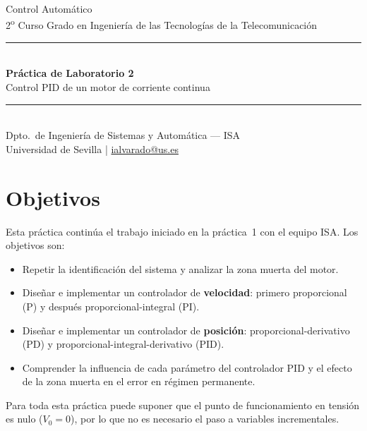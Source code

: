 \documentclass[12pt,a4paper]{article}
\begin{document}

\begin{center}
  {\large Control Automático}\\[2pt]
  {\large 2\textsuperscript{o} Curso Grado en Ingeniería de las Tecnologías de la Telecomunicación}\\[10pt]
  \rule{\linewidth}{1.5pt}\\[6pt]
  {\LARGE\bfseries\color{isablue} Práctica de Laboratorio 2}\\[4pt]
  {\Large Control PID de un motor de corriente continua}\\[4pt]
  \rule{\linewidth}{1.5pt}\\[6pt]
  {\small Dpto.\ de Ingeniería de Sistemas y Automática — ISA\\
   Universidad de Sevilla \quad | \quad \url{ialvarado@us.es}}
\end{center}

\vspace{6pt}

\section{Objetivos}

Esta práctica continúa el trabajo iniciado en la práctica~1 con el equipo ISA.
Los objetivos son:

\begin{itemize}[noitemsep]
  \item Repetir la identificación del sistema y analizar la zona muerta del motor.
  \item Diseñar e implementar un controlador de \textbf{velocidad}:
        primero proporcional (P) y después proporcional-integral (PI).
  \item Diseñar e implementar un controlador de \textbf{posición}:
        proporcional-derivativo (PD) y proporcional-integral-derivativo (PID).
  \item Comprender la influencia de cada parámetro del controlador PID y el
        efecto de la zona muerta en el error en régimen permanente.
\end{itemize}

\begin{notabox}
  Para toda esta práctica puede suponer que el punto de funcionamiento en tensión
  es nulo ($V_0=0$), por lo que no es necesario el paso a variables incrementales.
\end{notabox}
\end{document}
